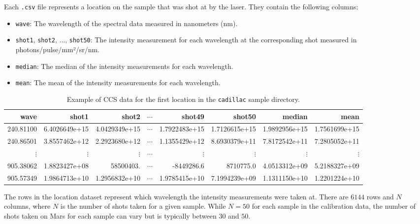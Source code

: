 Each \texttt{.csv} file represents a location on the sample that was shot at by the laser.
They contain the following columns:

\begin{itemize}
    \item \texttt{wave}: The wavelength of the spectral data measured in nanometers (nm).
    \item \texttt{shot1}, \texttt{shot2}, ..., \texttt{shot50}: The intensity measurement for each wavelength at the corresponding shot measured in photons/pulse/mm²/sr/nm.
    \item \texttt{median}: The median of the intensity measurements for each wavelength.
    \item \texttt{mean}: The mean of the intensity measurements for each wavelength.
\end{itemize}

\begin{table}[!b]
\centering
\begin{tabular}{rrrrrrrr}
\toprule
     wave &         shot1 &         shot2 &  $\cdots$ &        shot49 &       shot50  & median        & mean          \\
\midrule
240.81100 & 6.4026649e+15 & 4.0429349e+15 & $\cdots$  & 1.7922483e+15 & 1.7126615e+15 & 1.9892956e+15 & 1.7561699e+15 \\
240.86501 & 3.8557462e+12 & 2.2923680e+12 & $\cdots$  & 1.1355429e+12 & 8.6930379e+11 & 7.8172542e+11 & 7.2805052e+11 \\
$\vdots$  & $\vdots$      & $\vdots$      & $\cdots$  & $\vdots$      & $\vdots$      & $\vdots$      & $\vdots$      \\
905.38062 & 1.8823427e+08 & 58500403.     & $\cdots$  & -8449286.6    & 8710775.0     & 4.0513312e+09 & 5.2188327e+09 \\
905.57349 & 1.9864713e+10 & 1.2956832e+10 & $\cdots$  & 1.9785415e+10 & 7.1994239e+09 & 1.1311150e+10 & 1.2201224e+10 \\
\bottomrule
\end{tabular}
\caption{Example of CCS data for the first location in the \texttt{cadillac} sample directory.}
\label{tab:ccs_data_example}
\end{table}

The rows in the location dataset represent which wavelength the intensity measurements were taken at.
There are $6144$ rows and $N$ columns, where $N$ is the number of shots taken for a given sample.
While $N=50$ for each sample in the calibration data, the number of shots taken on Mars for each sample can vary but is typically between $30$ and $50$\cite{maurice_chemcam_2016}.


